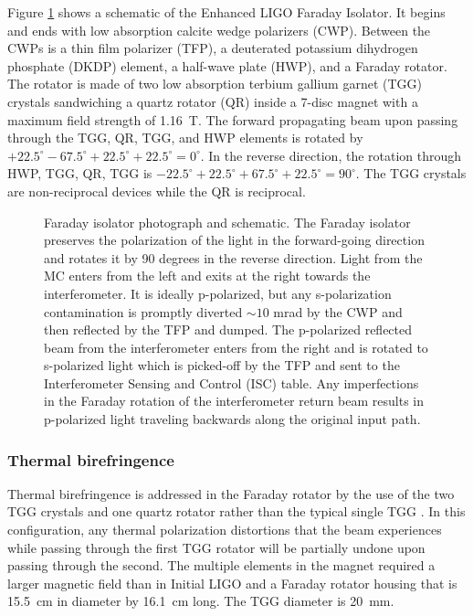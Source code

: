 Figure \ref{fig:FI} shows a schematic of the Enhanced LIGO Faraday
Isolator. It begins and ends with low absorption calcite wedge
polarizers (CWP). Between the CWPs is a thin film polarizer (TFP), a
deuterated potassium dihydrogen phosphate (DKDP) element, a half-wave
plate (HWP), and a Faraday rotator. The rotator is made of two low
absorption terbium gallium garnet (TGG) crystals sandwiching a quartz
rotator (QR) inside a 7-disc magnet with a maximum field strength of
1.16~T. The forward propagating beam upon passing through the TGG, QR,
TGG, and HWP elements is rotated by $+22.5^\circ - 67.5^\circ +
22.5^\circ + 22.5^\circ = 0^\circ$. In the reverse direction, the
rotation through HWP, TGG, QR, TGG is $-22.5^\circ + 22.5^\circ +
67.5^\circ + 22.5^\circ = 90^\circ$. The TGG crystals are
non-reciprocal devices while the QR is reciprocal.

\begin{figure}
\begin{centering}
\caption[Faraday isolator photograph and schematic.]{Faraday isolator
  photograph and schematic. The Faraday isolator preserves the
  polarization of the light in the forward-going direction and rotates
  it by 90 degrees in the reverse direction. Light from the MC enters
  from the left and exits at the right towards the interferometer. It
  is ideally p-polarized, but any s-polarization contamination is
  promptly diverted $\sim 10$ mrad by the CWP and then reflected by
  the TFP and dumped. The p-polarized reflected beam from the
  interferometer enters from the right and is rotated to s-polarized
  light which is picked-off by the TFP and sent to the Interferometer
  Sensing and Control (ISC) table. Any imperfections in the Faraday
  rotation of the interferometer return beam results in p-polarized
  light traveling backwards along the original input path.}
\label{fig:FI}
\end{centering}
\end{figure}

\subsubsection{Thermal birefringence} 
Thermal birefringence is addressed in the Faraday rotator by the use
of the two TGG crystals and one quartz rotator rather than the typical
single TGG \citep{Khazanov2000Suppression}.  In this configuration, any
thermal polarization distortions that the beam experiences while
passing through the first TGG rotator will be partially undone upon
passing through the second. 
The multiple elements in the magnet required a larger magnetic field
than in Initial LIGO and a Faraday rotator housing that is 15.5~cm in
diameter by 16.1~cm long. The TGG diameter is 20~mm.

